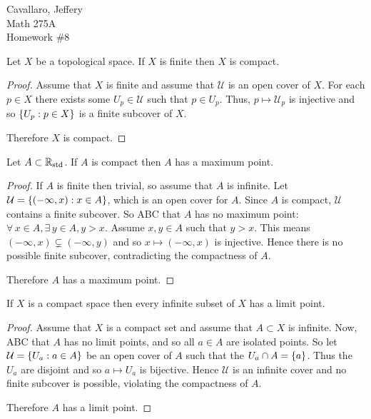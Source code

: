 \documentclass[letterpaper,12pt,fleqn]{article}
\newcommand{\U}{\mathcal{U}}
\newcommand{\Rs}{\R_{\text{std}}}
\begin{document}
Cavallaro, Jeffery \\
Math 275A \\
Homework \#8

\bigskip

\begin{theorem}[6.1]
  Let \(X\) be a topological space.  If \(X\) is finite then \(X\) is compact.
\end{theorem}

\begin{proof}
  Assume that \(X\) is finite and assume that \(\U\) is an open cover of \(X\).  For each \(p\in X\) there exists
  some \(U_p\in\U\) such that \(p\in U_p\).  Thus, \(p\mapsto\U_p\) is injective and so \(\{U_p:p\in X\}\) is a
  finite subcover of \(X\).

  Therefore \(X\) is compact.
\end{proof}

\begin{theorem}[6.2]
  Let \(A\subset\Rs\).  If \(A\) is compact then \(A\) has a maximum point.
\end{theorem}

\begin{proof}
  If \(A\) is finite then trivial, so assume that \(A\) is infinite.  Let \(\U=\set{(-\infty,x):x\in A}\), which is
  an open cover for \(A\).  Since \(A\) is compact, \(\U\) contains a finite subcover.  So ABC that \(A\) has no
  maximum point: \(\forall\,x\in A,\exists\,y\in A,y>x\).  Assume \(x,y\in A\) such that \(y>x\).  This means
  \((-\infty,x)\subsetneq(-\infty,y)\) and so \(x\mapsto(-\infty,x)\) is injective.  Hence there is no possible
  finite subcover, contradicting the compactness of \(A\).

  Therefore \(A\) has a maximum point.
\end{proof}

\begin{theorem}[6.3]
  If \(X\) is a compact space then every infinite subset of \(X\) has a limit point.
\end{theorem}

\begin{proof}
  Assume that \(X\) is a compact set and assume that \(A\subset X\) is infinite.  Now, ABC that \(A\) has no
  limit points, and so all \(a\in A\) are isolated points.  So let \(\U=\set{U_a:a\in A}\) be an open cover of \(A\)
  such that the \(U_a\cap A=\{a\}\).  Thus the \(U_a\) are disjoint and so \(a\mapsto U_a\) is bijective.  Hence
  \(\U\) is an infinite cover and no finite subcover is possible, violating the compactness of \(A\).

  Therefore \(A\) has a limit point.
\end{proof}
\end{document}
